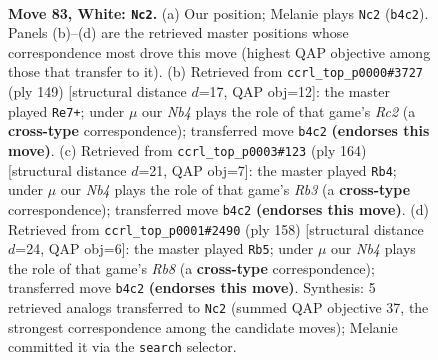 \documentclass[11pt]{article}
\begin{document}
\clearpage

\begin{figure}[p]\centering
\begin{subfigure}{0.46\textwidth}\centering
\resizebox{\linewidth}{!}{%
\newchessgame
\chessboard[
  setfen={1R6/6p1/3r1p2/3P1k1p/1N5P/5KP1/8/8 w - - 5 83},
  showmover=false,
  pgfstyle=straightmove, color=movearrow, markmove={b4-c2}
]}
\caption{}
\end{subfigure}\hfill
\begin{subfigure}{0.46\textwidth}\centering
\resizebox{\linewidth}{!}{%
\newchessgame
\chessboard[
  setfen={8/2r5/6k1/3R1p1p/2p5/2P1K1P1/3P4/8 b - - 1 75},
  showmover=false,
  pgfstyle=straightmove, color=movearrow, markmove={c7-e7}
]}
\caption{}
\end{subfigure}
\\[4pt]
\begin{subfigure}{0.46\textwidth}\centering
\resizebox{\linewidth}{!}{%
\newchessgame
\chessboard[
  setfen={8/5r1k/6p1/6Pp/7P/1R3P2/6K1/8 w - - 79 83},
  showmover=false,
  pgfstyle=straightmove, color=movearrow, markmove={b3-b4}
]}
\caption{}
\end{subfigure}\hfill
\begin{subfigure}{0.46\textwidth}\centering
\resizebox{\linewidth}{!}{%
\newchessgame
\chessboard[
  setfen={1R6/5rk1/6p1/6Pp/7P/5PK1/8/8 w - - 73 80},
  showmover=false,
  pgfstyle=straightmove, color=movearrow, markmove={b8-b5}
]}
\caption{}
\end{subfigure}
\caption{\textbf{Move 83, White: \texttt{Nc2}.} (a) Our position; Melanie plays \texttt{Nc2} (\texttt{b4c2}). Panels (b)--(d) are the retrieved master positions whose correspondence most drove this move (highest QAP objective among those that transfer to it). (b) Retrieved from \texttt{ccrl\_top\_p0000\#3727} (ply 149) [structural distance $d$=17, QAP obj=12]: the master played \texttt{Re7+}; under $\mu$ our \emph{Nb4} plays the role of that game's \emph{Rc2} (a \textbf{cross-type} correspondence); transferred move \texttt{b4c2} \textbf{(endorses this move)}. (c) Retrieved from \texttt{ccrl\_top\_p0003\#123} (ply 164) [structural distance $d$=21, QAP obj=7]: the master played \texttt{Rb4}; under $\mu$ our \emph{Nb4} plays the role of that game's \emph{Rb3} (a \textbf{cross-type} correspondence); transferred move \texttt{b4c2} \textbf{(endorses this move)}. (d) Retrieved from \texttt{ccrl\_top\_p0001\#2490} (ply 158) [structural distance $d$=24, QAP obj=6]: the master played \texttt{Rb5}; under $\mu$ our \emph{Nb4} plays the role of that game's \emph{Rb8} (a \textbf{cross-type} correspondence); transferred move \texttt{b4c2} \textbf{(endorses this move)}. Synthesis: 5 retrieved analogs transferred to \texttt{Nc2} (summed QAP objective 37, the strongest correspondence among the candidate moves); Melanie committed it via the \texttt{search} selector.}
\label{fig:thought-m164}
\end{figure}
\end{document}
